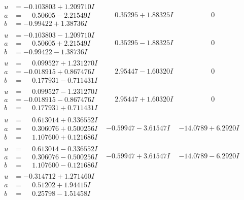 \documentclass[1p]{elsarticle_modified}
\theoremstyle{definition}
\begin{document}
$$\begin{array}{c|c|c}
\begin{aligned}
u &= -0.103803 + 1.209710 I \\
a &= \phantom{-}0.50605 - 2.21549 I \\
b &= -0.99422 + 1.38736 I\end{aligned}
 & \phantom{-}0.35295 + 1.88325 I & \phantom{-0.000000 } 0 \\ \hline\begin{aligned}
u &= -0.103803 - 1.209710 I \\
a &= \phantom{-}0.50605 + 2.21549 I \\
b &= -0.99422 - 1.38736 I\end{aligned}
 & \phantom{-}0.35295 - 1.88325 I & \phantom{-0.000000 } 0 \\ \hline\begin{aligned}
u &= \phantom{-}0.099527 + 1.231270 I \\
a &= -0.018915 + 0.867476 I \\
b &= \phantom{-}0.177931 - 0.711431 I\end{aligned}
 & \phantom{-}2.95447 - 1.60320 I & \phantom{-0.000000 } 0 \\ \hline\begin{aligned}
u &= \phantom{-}0.099527 - 1.231270 I \\
a &= -0.018915 - 0.867476 I \\
b &= \phantom{-}0.177931 + 0.711431 I\end{aligned}
 & \phantom{-}2.95447 + 1.60320 I & \phantom{-0.000000 } 0 \\ \hline\begin{aligned}
u &= \phantom{-}0.613014 + 0.336552 I \\
a &= \phantom{-}0.306076 + 0.500256 I \\
b &= \phantom{-}1.107600 + 0.121686 I\end{aligned}
 & -0.59947 - 3.61547 I & -14.0789 + 6.2920 I \\ \hline\begin{aligned}
u &= \phantom{-}0.613014 - 0.336552 I \\
a &= \phantom{-}0.306076 - 0.500256 I \\
b &= \phantom{-}1.107600 - 0.121686 I\end{aligned}
 & -0.59947 + 3.61547 I & -14.0789 - 6.2920 I \\ \hline\begin{aligned}
u &= -0.314712 + 1.271460 I \\
a &= \phantom{-}0.51202 + 1.94415 I \\
b &= \phantom{-}0.25798 - 1.51458 I\end{aligned}

\end{array}$$
\end{document}
